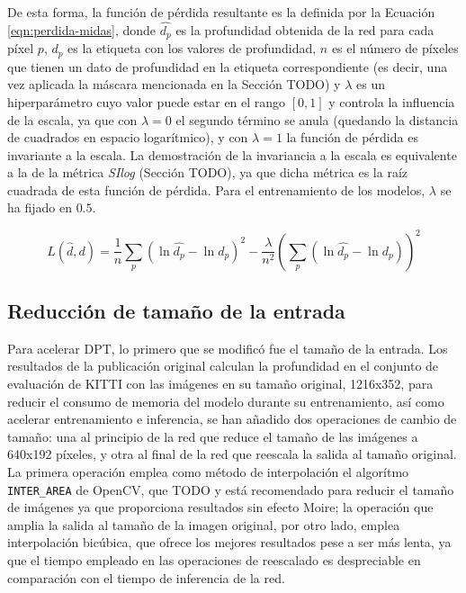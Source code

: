 De esta forma, la función de pérdida resultante es la definida por la Ecuación \ref{eqn:perdida-midas}, donde $\hat{d_p}$ es la profundidad obtenida de la red para cada píxel $p$, $d_p$ es la etiqueta con los valores de profundidad, $n$ es el número de píxeles que tienen un dato de profundidad en la etiqueta correspondiente (es decir, una vez aplicada la máscara mencionada en la Sección TODO) y $\lambda$ es un hiperparámetro cuyo valor puede estar en el rango $[0, 1]$ y controla la influencia de la escala, ya que con $\lambda=0$ el segundo término se anula (quedando la distancia de cuadrados en espacio logarítmico), y con $\lambda=1$ la función de pérdida es invariante a la escala. La demostración de la invariancia a la escala es equivalente a la de la métrica \textit{SIlog} (Sección TODO), ya que dicha métrica es la raíz cuadrada de esta función de pérdida. Para el entrenamiento de los modelos, $\lambda$ se ha fijado en $0.5$.

\begin{equation}
\label{eqn:perdida-midas}
L(\hat{d}, d) = \frac{1}{n}\sum_{p} (\ln{\hat{d_p}} - \ln{d_p})^2 - \frac{\lambda}{n^2} \left( \sum_{p} (\ln{\hat{d_p}} - \ln{d_p}) \right)^2
\end{equation}

\subsection{Reducción de tamaño de la entrada}
Para acelerar DPT, lo primero que se modificó fue el tamaño de la entrada. Los resultados de la publicación original calculan la profundidad en el conjunto de evaluación de KITTI con las imágenes en su tamaño original, 1216x352, para reducir el consumo de memoria del modelo durante su entrenamiento, así como acelerar entrenamiento e inferencia, se han añadido dos operaciones de cambio de tamaño: una al principio de la red que reduce el tamaño de las imágenes a 640x192 píxeles, y otra al final de la red que reescala la salida al tamaño original. La primera operación emplea como método de interpolación el algorítmo \texttt{INTER{\_}AREA} de OpenCV, que TODO y está recomendado para reducir el tamaño de imágenes ya que proporciona resultados sin efecto Moire; la operación que amplia la salida al tamaño de la imagen original, por otro lado, emplea interpolación bicúbica, que ofrece los mejores resultados pese a ser más lenta, ya que el tiempo empleado en las operaciones de reescalado es despreciable en comparación con el tiempo de inferencia de la red.

